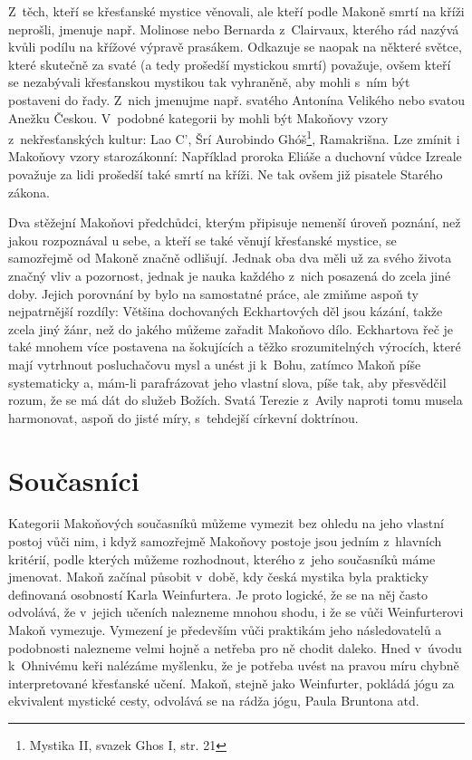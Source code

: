 Z~těch, kteří se křesťanské mystice věnovali, ale kteří podle Makoně smrtí na
kříži neprošli, jmenuje např. Molinose nebo Bernarda z~Clairvaux, kterého rád
nazývá kvůli podílu na křížové výpravě prasákem. Odkazuje se naopak na některé
světce, které skutečně za svaté (a tedy prošedší mystickou smrtí) považuje, ovšem
kteří se nezabývali křesťanskou mystikou tak vyhraněně, aby mohli s~ním být
postaveni do řady. Z~nich jmenujme např. svatého Antonína
Velikého nebo svatou
Anežku Českou. V~podobné kategorii by mohli být Makoňovy vzory z~nekřesťanských
kultur: Lao C', Šrí Aurobindo Ghóš\footnote{Mystika II,
svazek Ghos I, str. 21}, Ramakrišna. Lze zmínit i Makoňovy vzory
starozákonní: Například proroka Eliáše a duchovní vůdce
Izreale považuje za lidi prošedší také smrtí na kříži. Ne tak ovšem již pisatele
Starého zákona.

Dva stěžejní Makoňovi předchůdci, kterým připisuje nemenší úroveň poznání, než jakou
rozpoznával u sebe, a kteří se také věnují křesťanské mystice, se samozřejmě od
Makoně značně odlišují. Jednak oba dva měli už za svého života značný vliv a
pozornost\cite{hackett2012companion}\cite{britannicaTeresa}, jednak je nauka každého z~nich posazená do zcela jiné doby. Jejich
porovnání by bylo na samostatné práce, ale zmiňme aspoň ty nejpatrnější rozdíly:
Většina dochovaných Eckhartových děl jsou kázání, takže zcela jiný žánr, než do
jakého můžeme zařadit Makoňovo dílo. Eckhartova řeč je také mnohem více
postavena na šokujících a těžko srozumitelných výrocích, které mají vytrhnout
posluchačovu mysl a unést ji k~Bohu\cite{landauer1978eckhart}, zatímco Makoň píše systematicky a, mám-li
parafrázovat jeho vlastní slova, píše tak, aby přesvědčil rozum, že se má dát do služeb
Božích. Svatá Terezie z~Avily naproti tomu musela harmonovat, aspoň do jisté
míry, s~tehdejší církevní doktrínou\cite{eire2019life}.

\section{Současníci}

Kategorii Makoňových současníků můžeme vymezit bez ohledu na jeho vlastní postoj
vůči nim, i když samozřejmě Makoňovy postoje jsou jedním z~hlavních kritérií,
podle kterých můžeme rozhodnout, kterého z~jeho současníků máme jmenovat. Makoň
začínal působit v~době, kdy česká mystika byla prakticky definovaná osobností
Karla Weinfurtera\cite{sanitrak2006dejiny1}. Je proto logické, že se na něj
často odvolává, že v~jejich učeních nalezneme mnohou shodu, i že se vůči
Weinfurterovi Makoň vymezuje. Vymezení je především vůči praktikám jeho
následovatelů a podobnosti nalezneme velmi hojně a netřeba pro ně chodit
daleko. Hned v~úvodu k~Ohnivému keři\cite{weinfurter1923ohnivy} nalézáme
myšlenku, že je potřeba uvést na pravou míru chybně interpretované křesťanské
učení. Makoň, stejně jako Weinfurter, pokládá jógu za ekvivalent mystické cesty,
odvolává se na rádža jógu, Paula Bruntona atd.

